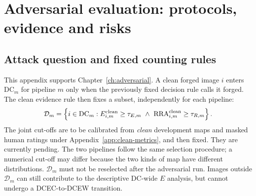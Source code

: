 
\chapter{Adversarial evaluation: protocols, evidence and risks}
\label{app:adv-details}

\section{Attack question and fixed counting rules}
\label{app:adv-counting}

This appendix supports Chapter~\ref{ch:adversarial}. A clean forged image $i$ enters $\mathrm{DC}_m$ for pipeline $m$ only when the previously fixed decision rule calls it forged. The clean evidence rule then fixes a subset, independently for each pipeline:
\begin{equation}
\mathcal{D}_m=\left\{i\in\mathrm{DC}_m:
E_{i,m}^{\rm clean}\geq\tau_{E,m}\ \land\
\mathrm{RRA}_{i,m}^{\rm clean}\geq\tau_{R,m}\right\}.
\label{eq:app-adv-dcec}
\end{equation}
The joint cut-offs are to be calibrated from \emph{clean} development maps and masked human ratings under Appendix~\ref{app:clean-metrics}, and then fixed. They are currently pending. The two pipelines follow the same selection procedure; a numerical cut-off may differ because the two kinds of map have different distributions. $\mathcal{D}_m$ must not be reselected after the adversarial run. Images outside $\mathcal{D}_m$ can still contribute to the descriptive DC-wide $E$ analysis, but cannot undergo a DCEC-to-DCEW transition.

